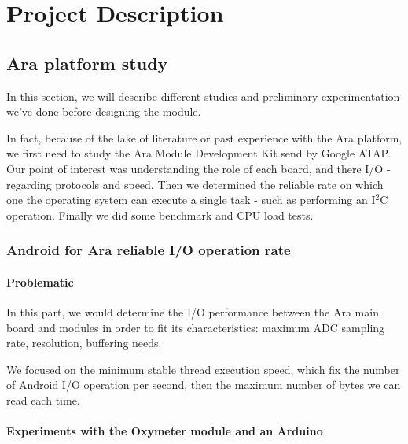 
\chapter{Project Description}

\label{ProjectD}



\section{Ara platform study}

In this section, we will describe different studies and preliminary experimentation we've done before designing  the module.

In fact, because of the lake of literature or past experience with the Ara platform, we first need to study the Ara Module Development Kit send by Google ATAP. Our point of interest was understanding the role of each board, and there I/O - regarding protocols and speed. Then we determined the reliable rate on which one the operating system can execute a single task - such as performing an I$^2$C operation. Finally we did some benchmark and CPU load tests. 

\subsection{Android for Ara reliable I/O operation rate}  \label{result-ara}

\subsubsection{Problematic}

In this part, we would determine the I/O performance between the Ara main board and modules in order to fit its characteristics: maximum ADC sampling rate, resolution, buffering needs.

We focused on the minimum stable thread execution speed, which fix the number of Android I/O operation per second, then the maximum number of bytes we can read each time.

\subsubsection{Experiments with the Oxymeter module and an Arduino}

